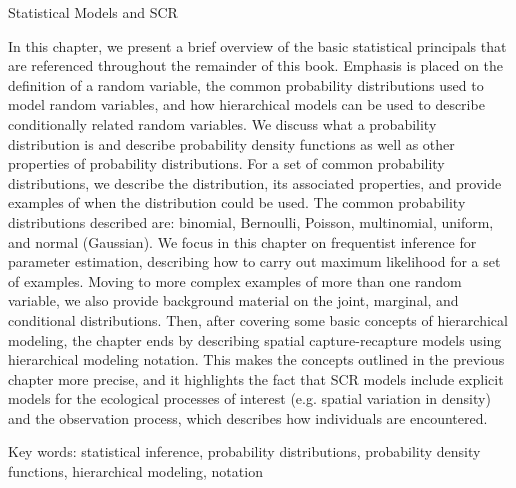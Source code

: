 Statistical Models and SCR

In this chapter, we present a brief overview of the basic
statistical principals that are referenced throughout the remainder of
this book. Emphasis is placed on the definition of a random variable,
the common probability distributions used to model random variables,
and how hierarchical models can be used to describe conditionally
related random variables.   We discuss what a probability distribution is and 
describe probability density functions as well as other properties of probability
distributions.  For a set of common probability distributions, we describe the distribution, 
its associated properties, and provide examples of when the distribution could be
used.  The common probability distributions described are: binomial, Bernoulli, Poisson, 
multinomial, uniform, and normal (Gaussian).
We focus in this chapter on frequentist inference for parameter estimation, describing how
to carry out maximum likelihood for a set of examples.  Moving to more
complex examples of more than one random variable, we also provide background
material on the joint, marginal, and conditional distributions.
Then, after covering some basic concepts of hierarchical modeling, the
chapter ends by describing spatial capture-recapture models using
hierarchical modeling notation. This makes the concepts outlined in
the previous chapter more precise, and it highlights the fact that SCR
models include explicit models for the ecological
processes of interest (e.g. spatial variation in density) and the
observation process, which describes how individuals are encountered.

Key words: statistical inference, probability distributions, probability density functions, 
hierarchical modeling, notation 